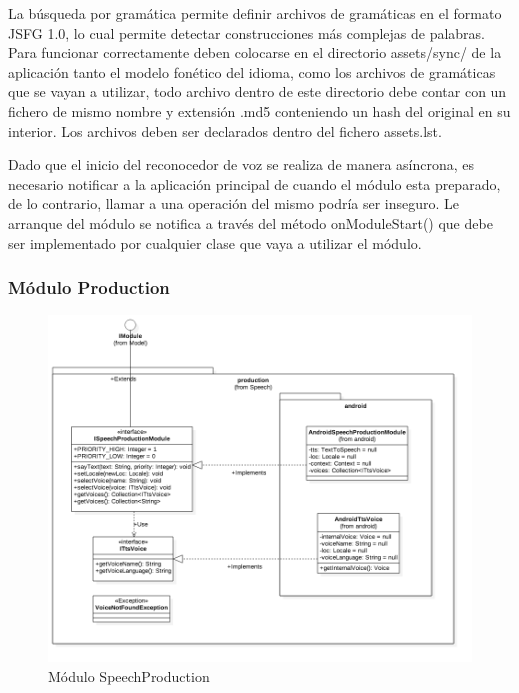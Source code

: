 La búsqueda por gramática permite definir archivos de gramáticas en el formato  JSFG 1.0\cite{JSFGGrammar}, lo cual permite detectar construcciones más complejas de palabras.
Para funcionar correctamente deben colocarse en el directorio assets/sync/ de la aplicación tanto el modelo fonético del idioma, como los archivos de gramáticas que se vayan a utilizar, todo archivo dentro de este directorio debe contar con un fichero de mismo nombre y extensión .md5 conteniendo un hash del original en su interior. Los archivos deben ser declarados dentro del fichero assets.lst.

Dado que el inicio del reconocedor de voz se realiza de manera asíncrona, es necesario notificar a la aplicación principal de cuando el módulo esta preparado, de lo contrario, llamar a una operación del mismo podría ser inseguro. Le arranque del módulo se notifica a través del método onModuleStart() que debe ser implementado por cualquier clase que vaya a utilizar el  módulo.


\subsubsection{Módulo Production}
\begin{figure}
	\centering
	\includegraphics[width=1\linewidth]{imagenes/diagramas/SpeechProductionModule.png}
	\caption{Módulo SpeechProduction}
	\label{fig:speech-production-module}
\end{figure}

